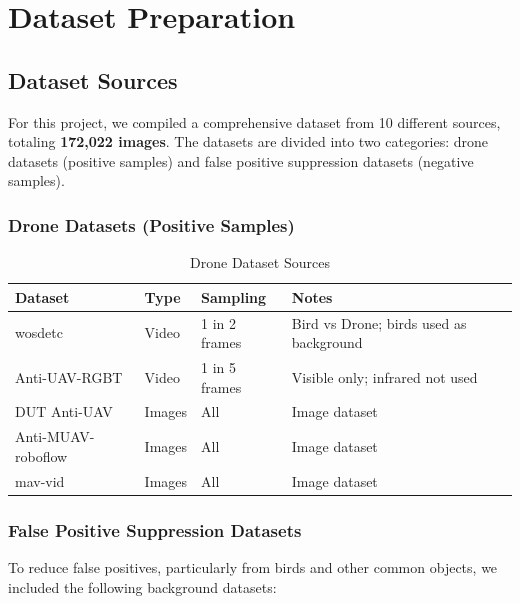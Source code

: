 \documentclass[a4paper,12pt]{report}
\begin{document}
\newpage

\chapter{Dataset Preparation}

\section{Dataset Sources}

For this project, we compiled a comprehensive dataset from 10 different sources, totaling \textbf{172,022 images}. The datasets are divided into two categories: drone datasets (positive samples) and false positive suppression datasets (negative samples).

\subsection{Drone Datasets (Positive Samples)}

\begin{table}[H]
\centering
\caption{Drone Dataset Sources}
\label{tab:drone_datasets}
\begin{tabular}{|l|l|l|l|}
\hline
\textbf{Dataset} & \textbf{Type} & \textbf{Sampling} & \textbf{Notes} \\
\hline
wosdetc & Video & 1 in 2 frames & Bird vs Drone; birds used as background \\
\hline
Anti-UAV-RGBT & Video & 1 in 5 frames & Visible only; infrared not used \\
\hline
DUT Anti-UAV & Images & All & Image dataset \\
\hline
Anti-MUAV-roboflow & Images & All & Image dataset \\
\hline
mav-vid & Images & All & Image dataset \\
\hline
\end{tabular}
\end{table}

\subsection{False Positive Suppression Datasets}

To reduce false positives, particularly from birds and other common objects, we included the following background datasets:
\end{document}
